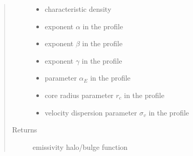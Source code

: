 \documentclass[letterpaper,10pt,english]{sphinxmanual}
\begin{document}
\begin{fulllineitems}
\begin{quote}
\begin{description}
\begin{itemize}
\item {} 
\sphinxAtStartPar
{} \textendash{} characteristic density

\item {} 
\sphinxAtStartPar
{} \textendash{} exponent \(\alpha\) in the {\hyperref[\detokenize{diffsph.profiles:diffsph.profiles.templates.hdz}]{}} profile

\item {} 
\sphinxAtStartPar
{} \textendash{} exponent \(\beta\) in the {\hyperref[\detokenize{diffsph.profiles:diffsph.profiles.templates.hdz}]{}} profile

\item {} 
\sphinxAtStartPar
{} \textendash{} exponent \(\gamma\) in the {\hyperref[\detokenize{diffsph.profiles:diffsph.profiles.templates.hdz}]{}} profile

\item {} 
\sphinxAtStartPar
{} \textendash{} parameter \(\alpha_E\) in the {\hyperref[\detokenize{diffsph.profiles:diffsph.profiles.templates.enst}]{}} profile

\item {} 
\sphinxAtStartPar
{} \textendash{} core radius parameter \(r_c\) in the {\hyperref[\detokenize{diffsph.profiles:diffsph.profiles.templates.cnfw}]{}} profile

\item {} 
\sphinxAtStartPar
{} \textendash{} velocity dispersion parameter \(\sigma_v\) in the {\hyperref[\detokenize{diffsph.profiles:diffsph.profiles.templates.sis}]{}} profile

\end{itemize}

\item[{Returns}] \leavevmode
\sphinxAtStartPar
emissivity halo/bulge function

\end{description}\end{quote}

\end{fulllineitems}
\end{document}
